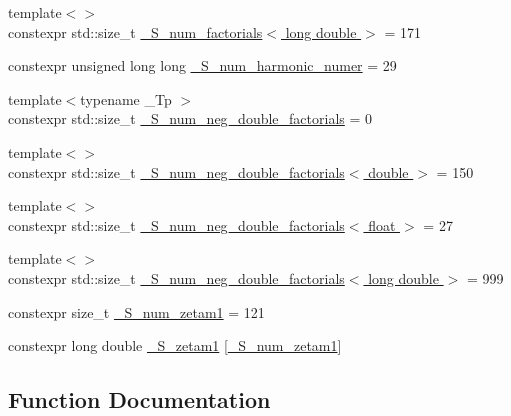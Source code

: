 \begin{DoxyCompactItemize}
\item 
{\footnotesize template$<$$>$ }\\constexpr std\+::size\+\_\+t \hyperlink{namespacestd_1_1____detail_ab90b8eb39ff963a5ed533a3be0b7f7fd}{\+\_\+\+S\+\_\+num\+\_\+factorials$<$ long double $>$} = 171
\item 
constexpr unsigned long long \hyperlink{namespacestd_1_1____detail_a554788747841f6abbfd7572673df32ad}{\+\_\+\+S\+\_\+num\+\_\+harmonic\+\_\+numer} = 29
\item 
{\footnotesize template$<$typename \+\_\+\+Tp $>$ }\\constexpr std\+::size\+\_\+t \hyperlink{namespacestd_1_1____detail_ac386f200e589ce1fc895c2aac0e47f8c}{\+\_\+\+S\+\_\+num\+\_\+neg\+\_\+double\+\_\+factorials} = 0
\item 
{\footnotesize template$<$$>$ }\\constexpr std\+::size\+\_\+t \hyperlink{namespacestd_1_1____detail_a2d14a1207a6fea22f32586dfd41cf49d}{\+\_\+\+S\+\_\+num\+\_\+neg\+\_\+double\+\_\+factorials$<$ double $>$} = 150
\item 
{\footnotesize template$<$$>$ }\\constexpr std\+::size\+\_\+t \hyperlink{namespacestd_1_1____detail_a3ce62e66e9a196fd89b4d841f7374d68}{\+\_\+\+S\+\_\+num\+\_\+neg\+\_\+double\+\_\+factorials$<$ float $>$} = 27
\item 
{\footnotesize template$<$$>$ }\\constexpr std\+::size\+\_\+t \hyperlink{namespacestd_1_1____detail_a2ef051ec96e521e71489d2327d11c22a}{\+\_\+\+S\+\_\+num\+\_\+neg\+\_\+double\+\_\+factorials$<$ long double $>$} = 999
\item 
constexpr size\+\_\+t \hyperlink{namespacestd_1_1____detail_a807e36c2aec3a9f27fdb21726cd464e2}{\+\_\+\+S\+\_\+num\+\_\+zetam1} = 121
\item 
constexpr long double \hyperlink{namespacestd_1_1____detail_a22ed80d9e5c3bc79e61a3cdb8e79a462}{\+\_\+\+S\+\_\+zetam1} \mbox{[}\hyperlink{namespacestd_1_1____detail_a807e36c2aec3a9f27fdb21726cd464e2}{\+\_\+\+S\+\_\+num\+\_\+zetam1}\mbox{]}
\end{DoxyCompactItemize}


\subsection{Function Documentation}
\mbox{\label{namespacestd_1_1____detail_ab88aba2ff9e70425c477043a9fa6a0dc}} 
